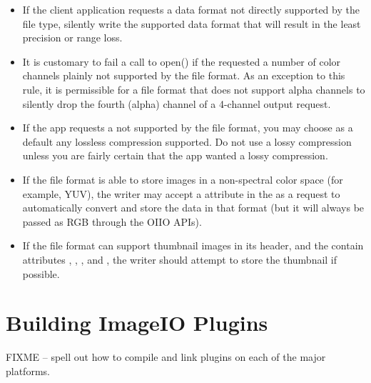 \begin{itemize}
\item If the client application requests a data format not directly
  supported by the file type, silently write the supported data format
  that will result in the least precision or range loss.
\item It is customary to fail a call to {\cf open()} if the \ImageSpec
  requested a number of color channels plainly not supported by the
  file format.  As an exception to this rule, it is permissible for a
  file format that does not support alpha channels to silently drop
  the fourth (alpha) channel of a 4-channel output request.
\item If the app requests a  not supported by the file
  format, you may choose as a default any lossless compression
  supported.  Do not use a lossy compression unless you are fairly 
  certain that the app wanted a lossy compression.
\item If the file format is able to store images in a non-spectral color
  space (for example, YUV), the writer may accept a 
  attribute in the \ImageSpec as a request to automatically convert and
  store the data in that format (but it will always be passed as RGB
  through the OIIO APIs).
\item If the file format can support thumbnail images in its header, and
  the \ImageSpec contain attributes ,
  , , and
  , the writer should attempt to store the
  thumbnail if possible.
\end{itemize}



\section{Building ImageIO Plugins}
\label{sec:buildingplugins}

FIXME -- spell out how to compile and link plugins on each of the major
platforms.


\chapwidthend
